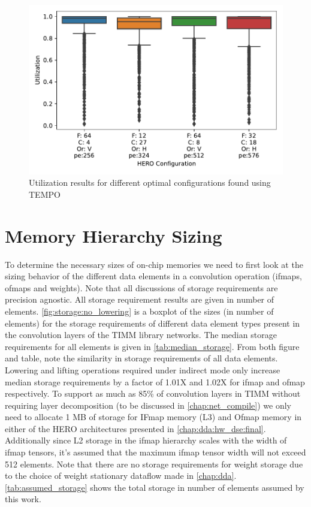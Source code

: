 \begin{figure}[]
    \centering
    \includegraphics[scale=0.7]{Plots/tempo.pdf}
    \caption{Utilization results for different optimal configurations found using TEMPO}
    \label{fig:tempo_results}
\end{figure}


\section{Memory Hierarchy Sizing}
\label{chap:dataflow_dse:memory_hierarchy_sizing}

To determine the necessary sizes of on-chip memories we need to first look at
the sizing behavior of the different data elements in a convolution operation
(ifmaps, ofmaps and weights). Note that all discussions of storage requirements
are precision agnostic. All storage requirement results are given in number of
elements. \autoref{fig:storage:no_lowering} is a boxplot of the sizes (in number
of elements) for the storage requirements of different data element types
present in the convolution layers of the TIMM library networks. The median
storage requirements for all elements is given in \autoref{tab:median_storage}.
From both figure and table, note the similarity in storage requirements of all
data elements. Lowering and lifting operations required under indirect mode only
increase median storage requirements by a factor of 1.01X and 1.02X for ifmap
and ofmap respectively. To support as much as 85\% of convolution layers in TIMM
without requiring layer decomposition (to be discussed in
\autoref{chap:net_compile}) we only need to allocate 1 MB of storage for IFmap
memory (L3) and Ofmap memory in either of the HERO architectures presented in
\autoref{chap:dda:hw_dse:final}. Additionally since L2 storage in the ifmap
hierarchy scales with the width of ifmap tensors, it's assumed that the maximum
ifmap tensor width will not exceed 512 elements. Note that there are no storage
requirements for weight storage due to the choice of weight stationary dataflow
made in \autoref{chap:dda}. \autoref{tab:assumed_storage} shows the total
storage in number of elements assumed by this work. 

